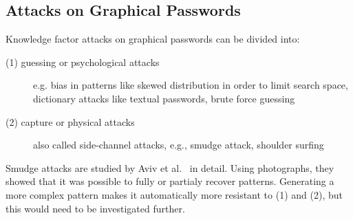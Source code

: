 \documentclass[twocolumn, a4paper, 10pt]{article}
\begin{document}
\subsection{Attacks on Graphical Passwords}
\label{sec:related:attacks}

Knowledge factor attacks on graphical passwords can be divided into:

\begin{description}
	\item[(1) guessing or psychological attacks] e.g. bias in patterns like skewed distribution in order to limit search space, dictionary attacks like textual passwords, brute force guessing
	\item[(2) capture or physical attacks] also called side-channel attacks, e.g., smudge attack, shoulder surfing
\end{description}

Smudge attacks are studied by Aviv et al.~\cite{Aviv:2010:SAS:1925004.1925009} in detail. Using photographs, they showed that it was possible to fully or partialy recover patterns. Generating a more complex pattern makes it automatically more resistant to (1) and (2), but this would need to be investigated further. 
\end{document}
